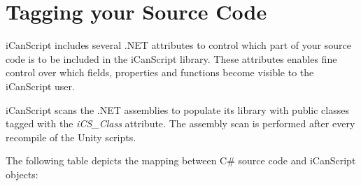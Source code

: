 \chapter{Tagging your Source Code}
\label{taggingyoursourcecode}

iCanScript includes several .NET attributes to control which part of your source code is to be included in the iCanScript library. These attributes enables fine control over which fields, properties and functions become visible to the iCanScript user.

iCanScript scans the .NET assemblies to populate its library with public classes tagged with the \emph{iCS\_Class} attribute. The assembly scan is performed after every recompile of the Unity scripts.

The following table depicts the mapping between C\# source code and iCanScript objects:

